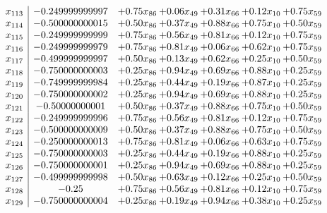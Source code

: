 \documentclass[8pt]{article}
\begin{document}
\[\begin{array}{c| c c@{\hskip 2pt} c@{\hskip 2pt} c@{\hskip 2pt} c@{\hskip 2pt} c@{\hskip 2pt} }
 x_{113}   &  -0.249999999997 & +  0.75 x_{86} & +  0.06 x_{49} & +  0.31 x_{66} & +  0.12 x_{10} & +  0.75 x_{59}\\
 x_{114}   &  -0.500000000015 & +  0.50 x_{86} & +  0.37 x_{49} & +  0.88 x_{66} & +  0.75 x_{10} & +  0.50 x_{59}\\
 x_{115}   &  -0.249999999999 & +  0.75 x_{86} & +  0.56 x_{49} & +  0.81 x_{66} & +  0.12 x_{10} & +  0.75 x_{59}\\
 x_{116}   &  -0.249999999979 & +  0.75 x_{86} & +  0.81 x_{49} & +  0.06 x_{66} & +  0.62 x_{10} & +  0.75 x_{59}\\
 x_{117}   &  -0.499999999997 & +  0.50 x_{86} & +  0.13 x_{49} & +  0.62 x_{66} & +  0.25 x_{10} & +  0.50 x_{59}\\
 x_{118}   &  -0.750000000003 & +  0.25 x_{86} & +  0.94 x_{49} & +  0.69 x_{66} & +  0.88 x_{10} & +  0.25 x_{59}\\
 x_{119}   &  -0.749999999984 & +  0.25 x_{86} & +  0.44 x_{49} & +  0.19 x_{66} & +  0.87 x_{10} & +  0.25 x_{59}\\
 x_{120}   &  -0.750000000002 & +  0.25 x_{86} & +  0.94 x_{49} & +  0.69 x_{66} & +  0.88 x_{10} & +  0.25 x_{59}\\
 x_{121}   &  -0.50000000001 & +  0.50 x_{86} & +  0.37 x_{49} & +  0.88 x_{66} & +  0.75 x_{10} & +  0.50 x_{59}\\
 x_{122}   &  -0.249999999996 & +  0.75 x_{86} & +  0.56 x_{49} & +  0.81 x_{66} & +  0.12 x_{10} & +  0.75 x_{59}\\
 x_{123}   &  -0.500000000009 & +  0.50 x_{86} & +  0.37 x_{49} & +  0.88 x_{66} & +  0.75 x_{10} & +  0.50 x_{59}\\
 x_{124}   &  -0.250000000013 & +  0.75 x_{86} & +  0.81 x_{49} & +  0.06 x_{66} & +  0.63 x_{10} & +  0.75 x_{59}\\
 x_{125}   &  -0.750000000003 & +  0.25 x_{86} & +  0.44 x_{49} & +  0.19 x_{66} & +  0.88 x_{10} & +  0.25 x_{59}\\
 x_{126}   &  -0.750000000001 & +  0.25 x_{86} & +  0.94 x_{49} & +  0.69 x_{66} & +  0.88 x_{10} & +  0.25 x_{59}\\
 x_{127}   &  -0.499999999998 & +  0.50 x_{86} & +  0.63 x_{49} & +  0.12 x_{66} & +  0.25 x_{10} & +  0.50 x_{59}\\
 x_{128}   &  -0.25 & +  0.75 x_{86} & +  0.56 x_{49} & +  0.81 x_{66} & +  0.12 x_{10} & +  0.75 x_{59}\\
 x_{129}   &  -0.750000000004 & +  0.25 x_{86} & +  0.19 x_{49} & +  0.94 x_{66} & +  0.38 x_{10} & +  0.25 x_{59}\\

\end{array}\]
\end{document}
